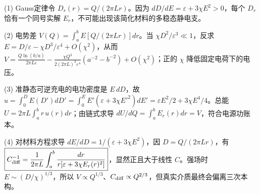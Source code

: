 (1) Gauss定律令 \(D_r(r)=Q/(2\pi Lr)\)。因为 \(dD/dE=\varepsilon+3\chi E^2>0\)，每个 \(D_r\) 恰有一个同号实解 \(E_r\)，不可能出现该简化材料的多稳态静电支。

(2) 电势差 \(V(Q)=\int_a^bE[Q/(2\pi Lr)]dr\)。当 \(\chi D^2/\varepsilon^3\ll1\)，反求 \(E=D/\varepsilon-\chi D^3/\varepsilon^4+O(\chi^2)\)，从而 \(V=\frac{Q\ln(b/a)}{2\pi L\varepsilon}-\frac{\chi Q^3}{2(2\pi L)^3\varepsilon^4}(a^{-2}-b^{-2})+O(\chi^2)\)；正的 \(\chi\) 降低固定电荷下的电压。

(3) 准静态可逆充电的电功密度是 \(E\,dD\)，故 \(u=\int_0^D E(D')dD'=\int_0^E E'(\varepsilon+3\chi E'^2)dE'=\varepsilon E^2/2+3\chi E^4/4\)。总能 \(U=2\pi L\int_a^br\,u(r)dr\)；由链式求导 \(dU/dQ=\int_a^bE_r(r)dr=V\)，符合电源功账本。

(4) 对材料方程求导 \(dE/dD=1/(\varepsilon+3\chi E^2)\)，因 \(D=Q/(2\pi Lr)\)，有 \(\boxed{C_{\rm diff}^{-1}=\frac1{2\pi L}\int_a^b\frac{dr}{r[\varepsilon+3\chi E_r(r)^2]}}\)，显然正且大于线性 \(C\)。强场时 \(E\sim(D/\chi)^{1/3}\)，所以 \(V\propto Q^{1/3}\)、\(C_{\rm diff}\propto Q^{2/3}\)，但真实介质最终会偏离三次本构。
